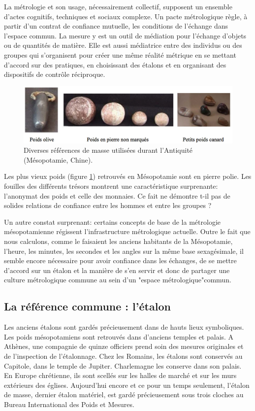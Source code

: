 \documentclass[main.tex]{subfiles}
\begin{document}
La métrologie et son usage, nécessairement collectif, supposent un ensemble d'actes cognitifs, techniques et sociaux complexe.  Un pacte métrologique règle, à partir d'un contrat de confiance mutuelle, les conditions de l'échange dans l'espace commun.  La mesure y est un outil de médiation pour l'échange d'objets ou de quantités de matière.  Elle est aussi médiatrice entre des individus ou des groupes qui s'organisent pour créer une même réalité métrique en se mettant d'accord sur des pratiques, en choisissant des étalons et en organisant des dispositifs de contrôle réciproque.

\begin{figure}[h]
   \centering
   \includegraphics[width=15cm]{fig/poids.pdf} 
   \caption{Diverses références de masse utilisées durant l'Antiquité (Mésopotamie, Chine).}
   \label{fig:1.1}
\end{figure}
Les plus vieux poids (figure \ref{fig:1.1}) retrouvés en Mésopotamie sont en pierre polie.  Les fouilles des différents trésors montrent une caractéristique surprenante: l'anonymat des poids et celle des monnaies.  Ce fait ne démontre t-il pas de solides relations de confiance entre les hommes et entre les groupes ?

Un autre constat surprenant: certains concepts de base de la métrologie mésopotamienne régissent l'infrastructure métrologique actuelle. Outre le fait que nous calculons, comme le faisaient les anciens habitants de la Mésopotamie, l'heure, les minutes, les secondes et les angles sur la même base sexagésimale, il semble encore nécessaire pour avoir confiance dans les échanges, de se mettre d'accord sur un étalon et la manière de s'en servir et donc de partager une culture métrologique commune au sein d'un "espace métrologique"commun.

\subsection{La référence commune : l'étalon}

Les anciens étalons sont gardés précieusement dans de hauts lieux symboliques.  Les poids mésopotamiens sont retrouvés dans d'anciens temples et palais. A Athènes, une compagnie de quinze officiers prend soin des mesures originales et de l'inspection de l'étalonnage.  Chez les Romains, les étalons sont conservés au Capitole, dans le temple de Jupiter. Charlemagne les conserve dans son palais.  En Europe chrétienne, ils sont scellés sur les halles de marché et sur les murs extérieurs des églises.  Aujourd'hui encore et ce pour un temps seulement, l'étalon de masse, dernier étalon matériel, est gardé précieusement sous trois cloches au Bureau International des Poids et Mesures.
\end{document}
